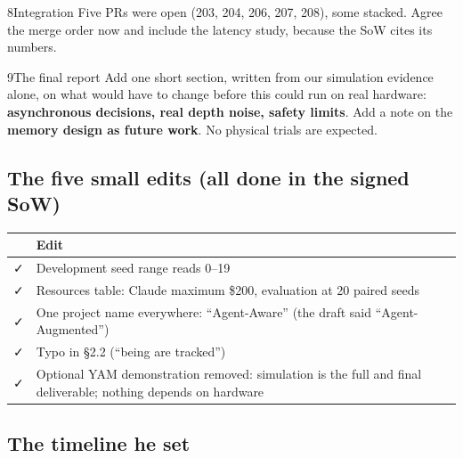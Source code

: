 \documentclass[11pt,a4paper]{article}
\newcommand{\yes}{\textcolor{leaf}{\faCheck}}
\begin{document}
\begin{ask}{8}{Integration}
Five PRs were open (203, 204, 206, 207, 208), some stacked. Agree the merge order now and include the latency study,
because the SoW cites its numbers.
\end{ask}

\begin{ask}{9}{The final report}
Add one short section, written from our simulation evidence alone, on what would have to change before this could run
on real hardware: \textbf{asynchronous decisions, real depth noise, safety limits}. Add a note on the \textbf{memory design as
future work}. No physical trials are expected.
\end{ask}

\subsection{The five small edits (all done in the signed SoW)}

\begin{center}\small
\begin{tabularx}{\linewidth}{@{}c X@{}}
\toprule
& Edit\\
\midrule
\yes & Development seed range reads 0--19\\
\yes & Resources table: Claude maximum \$200, evaluation at 20 paired seeds\\
\yes & One project name everywhere: ``Agent-Aware'' (the draft said ``Agent-Augmented'')\\
\yes & Typo in \S2.2 (``being are tracked'')\\
\yes & Optional YAM demonstration removed: simulation is the full and final deliverable; nothing depends on hardware\\
\bottomrule
\end{tabularx}
\end{center}

\subsection{The timeline he set}
\end{document}
